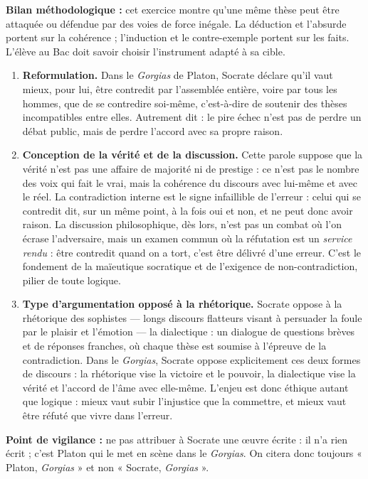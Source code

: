 \documentclass[11pt]{article}
\newcommand{\cle}[1]{{\popxbold\color{popdark}#1}}
\begin{document}
\begin{corrige}
\begin{enumerate}
\end{enumerate}

\textbf{Bilan méthodologique :} cet exercice montre qu'une même thèse peut être attaquée ou défendue par des voies de force inégale. La déduction et l'absurde portent sur la cohérence ; l'induction et le contre-exemple portent sur les faits. L'élève au Bac doit savoir choisir l'instrument adapté à sa cible.
\end{corrige}

\begin{corrige}
\begin{enumerate}
\item \textbf{Reformulation.} Dans le \emph{Gorgias} de Platon, Socrate déclare qu'il vaut mieux, pour lui, être contredit par l'assemblée entière, voire par tous les hommes, que de se contredire soi-même, c'est-à-dire de soutenir des thèses incompatibles entre elles. Autrement dit : le pire échec n'est pas de perdre un débat public, mais de perdre l'accord avec sa propre raison.
\item \textbf{Conception de la vérité et de la discussion.} Cette parole suppose que la vérité n'est pas une affaire de majorité ni de prestige : ce n'est pas le nombre des voix qui fait le vrai, mais la cohérence du discours avec lui-même et avec le réel. La contradiction interne est le signe infaillible de l'erreur : celui qui se contredit dit, sur un même point, à la fois oui et non, et ne peut donc avoir raison. La discussion philosophique, dès lors, n'est pas un combat où l'on écrase l'adversaire, mais un examen commun où la réfutation est un \emph{service rendu} : être contredit quand on a tort, c'est être délivré d'une erreur. C'est le fondement de la maïeutique socratique et de l'exigence de non-contradiction, pilier de toute logique.
\item \textbf{Type d'argumentation opposé à la rhétorique.} Socrate oppose à la rhétorique des sophistes --- longs discours flatteurs visant à persuader la foule par le plaisir et l'émotion --- la \cle{dialectique} : un dialogue de questions brèves et de réponses franches, où chaque thèse est soumise à l'épreuve de la contradiction. Dans le \emph{Gorgias}, Socrate oppose explicitement ces deux formes de discours : la rhétorique vise la victoire et le pouvoir, la dialectique vise la vérité et l'accord de l'âme avec elle-même. L'enjeu est donc éthique autant que logique : mieux vaut subir l'injustice que la commettre, et mieux vaut être réfuté que vivre dans l'erreur.
\end{enumerate}

\textbf{Point de vigilance :} ne pas attribuer à Socrate une œuvre écrite : il n'a rien écrit ; c'est Platon qui le met en scène dans le \emph{Gorgias}. On citera donc toujours « Platon, \emph{Gorgias} » et non « Socrate, \emph{Gorgias} ».
\end{corrige}
\end{document}
